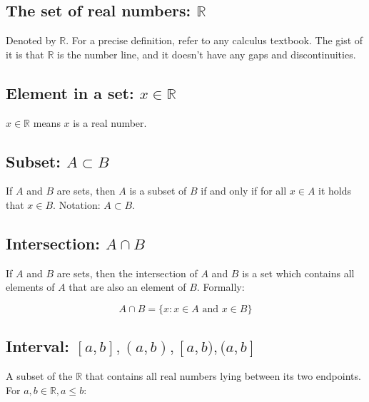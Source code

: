 \documentclass[titlepage]{article}
\begin{document}
      \subsection{The set of real numbers: $\mathbb{R}$}

        Denoted by $\mathbb{R}$. For a precise definition, refer to any
        calculus textbook. The gist of it is that $\mathbb{R}$ is the number
        line, and it doesn't have any gaps and discontinuities.

      \subsection{Element in a set: $x \in \mathbb{R}$}

        $x \in \mathbb{R}$ means $x$ is a real number.

      \subsection{Subset: $A \subset B$}

        If $A$ and $B$ are sets, then $A$ is a subset of $B$ if and only if
        for all $x \in A$ it holds that $x \in B$. Notation: $A \subset B$.

      \subsection{Intersection: $A \cap B$}

        If $A$ and $B$ are sets, then the intersection of $A$ and $B$ is a set
        which contains all elements of $A$ that are also an element of $B$.
        Formally:

        $$A \cap B = \{ x : x \in A \text{ and } x \in B \}$$

      \subsection{Interval: $[a, b], (a, b), [a, b), (a, b]$}

        A subset of the $\mathbb{R}$ that contains all real numbers lying
        between its two endpoints. For $a, b \in \mathbb{R}, a \leq b$:
\end{document}
